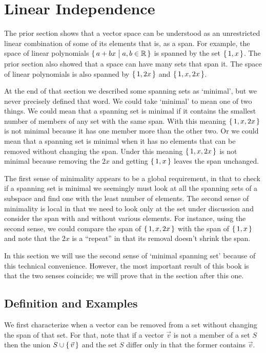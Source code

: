 \section{Linear Independence}
The prior section shows that a vector space can be 
understood as an unrestricted linear combination of some of its elements\Dash 
that is, as a span.
For example, the space of linear polynomials $\mbox{$\{\,a+bx\bigm| a,b\in\mathbb{R}\,\}$}$ 
is spanned by the set $\mbox{$\{\,1,x\,\}$}$.
The prior section also showed that a space can have many sets that span it.
The space of linear polynomials is also spanned by 
$\mbox{$\{\,1,2x\,\}$}$ and $\mbox{$\{\,1,x,2x\,\}$}$.

At the end of that section we described some spanning sets as `minimal',
but we never precisely defined that word.
We could take `minimal' to mean one of two things.
We could mean that a spanning set is minimal if it 
contains the smallest number of members of any set with the same span.
With this meaning $\mbox{$\{\,1,x,2x\,\}$}$ is not minimal because it has 
one member more than the other two.
Or we could mean that a spanning set is minimal when it has no elements 
that can be removed without changing the span.
Under this meaning $\mbox{$\{\,1,x,2x\,\}$}$ is not minimal because 
removing the \( 2x \) and getting \( \mbox{$\{\,1,x\,\}$} \) leaves the
span unchanged.

The first sense of minimality appears to be a global requirement, 
in that to check if a spanning set is minimal 
we seemingly must look at all the spanning sets of 
a subspace and find one with the least number of elements. 
The second sense of minimality is local in
that we need to look only at the set under discussion and consider the
span with and without various elements.
For instance, using the second sense,
we could compare the span of $\mbox{$\{\,1,x,2x\,\}$}$ 
with the span of $\mbox{$\{\,1,x\,\}$}$ and
note that the $2x$ is a ``repeat'' in that its removal doesn't shrink the span.

In this section we will use the second sense of `minimal spanning set'
because of this technical convenience.
However, the most important result of this book is that the two senses 
coincide; we will prove that in the section after this one.









\subsection{Definition and Examples}
We first characterize when a vector can be
removed from a set without changing the span of that set.
For that, note that if a vector $\vec{v}$ is not a member of a set $S$ 
then the union $S\cup\mbox{$\{\,\vec{v}\,\}$}$ 
and the set $S$ differ only in that
the former contains $\vec{v}$.


